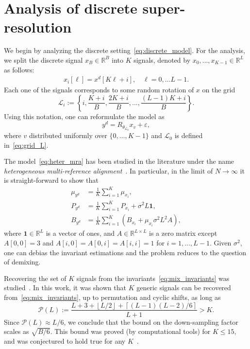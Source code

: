 \documentclass[english,12pt]{article}
\numberwithin{equation}{section}
\begin{document}
\section{Analysis of discrete super-resolution}

We begin by analyzing the discrete setting~\eqref{eq:discrete_model}. For the analysis, we split the discrete signal $x_B\in\mathbb{R}^B$ into $K$ signals, denoted by $x_0,\ldots,x_{K-1}\in\mathbb{R}^L$ as follows:
\begin{eqnarray}
x_i[\ell] = x^d[K\ell+i], \quad \ell=0,\ldots L-1. 
\end{eqnarray}
Each one of the signals corresponds to some random rotation of $x$ on the grid  $$\mathcal{L}_i:=\left\{i,\frac{K+i}{B},\frac{2K+i}{B},\ldots,\frac{(L-1)K+i}{B}\right\}.$$
Using this notation, one can reformulate the model as 
\begin{equation} \label{eq:heter_mra}
y^d =  R_{\theta_{\mathcal{L}_0}} x_{v} + \varepsilon,
\end{equation}
where $v$ distributed uniformly over $\{0,\ldots,K-1\}$ and $\mathcal{L}_0$ is defined in~\eqref{eq:grid_L}. 

The model~\eqref{eq:heter_mra} has been studied in the literature under the name \emph{heterogeneous multi-reference alignment}~\cite{perry2017sample,bandeira2017estimation,boumal2018heterogeneous}. In particular, in the limit of $N\to\infty$ it is straight-forward to show that 
\begin{align} \label{eq:mix_invariants}
\mu_{y^d} &= \frac{1}{K}\sum_{i=1}^K \mu_{x_i}, \nonumber\\
P_{y^d} &= \frac{1}{K}\sum_{i=1}^K P_{x_i} + \sigma^2L\mathbf{1}, \\
B_{y^d} &= \frac{1}{K}\sum_{i=1}^K (B_{x_i} +\mu_{x_i}\sigma^2L^2 A ), \nonumber
\end{align}
where $\mathbf{1}\in\mathbb{R}^L$ is a vector of ones, and $A\in\mathbb{R}^{L\times L}$ is a zero matrix except $A[0,0]=3$ and $A[i,0]=A[0,i]=A[i,i]=1$ for $i=1,\ldots,L-1$.
Given $\sigma^2$, one can debias the invariant estimations and the problem reduces to the question of demixing.

Recovering the set of $K$ signals from the invariants~\eqref{eq:mix_invariants} was studied~\cite{bandeira2017estimation}. In this work, it was shown that $K$ generic signals can be recovered from~\eqref{eq:mix_invariants}, up to permutation and cyclic shifts, as long as 
\begin{equation} \label{eq:Pl}
\mathcal{P}(L) := \frac{L+3+\left\lfloor L/2\right\rfloor +  \left\lceil (L-1)(L-2)/6\right\rceil}{L+1} > K.
\end{equation}
Since $\mathcal{P}(L) \approx L/6$, we conclude that the bound on the down-sampling factor scales as $\sqrt{B/6}$.
This bound was proved (by computational tools) for $K\leq 15$, and was conjectured to hold true for any $K$~\cite{bandeira2017estimation}.
\end{document}
